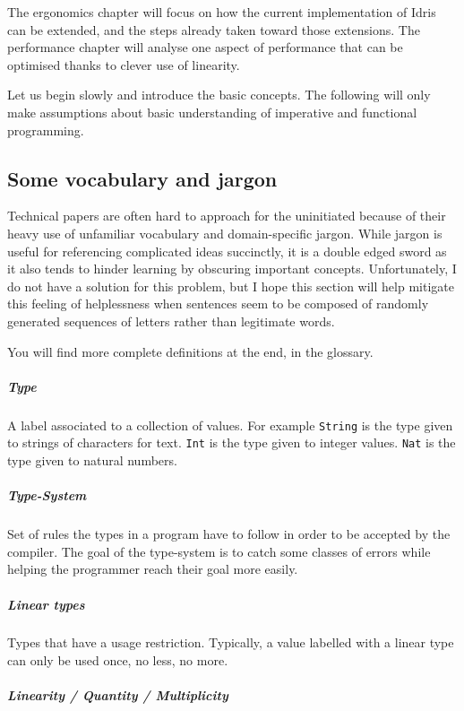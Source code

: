 \documentclass[
]{article}
\begin{document}
The ergonomics chapter will focus on how the current implementation of
Idris can be extended, and the steps already taken toward those
extensions. The performance chapter will analyse one aspect of
performance that can be optimised thanks to clever use of linearity.

Let us begin slowly and introduce the basic concepts. The following will
only make assumptions about basic understanding of imperative and
functional programming.

\hypertarget{some-vocabulary-and-jargon}{%
\subsection{Some vocabulary and
jargon}\label{some-vocabulary-and-jargon}}

Technical papers are often hard to approach for the uninitiated because
of their heavy use of unfamiliar vocabulary and domain-specific jargon.
While jargon is useful for referencing complicated ideas succinctly, it
is a double edged sword as it also tends to hinder learning by obscuring
important concepts. Unfortunately, I do not have a solution for this
problem, but I hope this section will help mitigate this feeling of
helplessness when sentences seem to be composed of randomly generated
sequences of letters rather than legitimate words.

You will find more complete definitions at the end, in the glossary.

\hypertarget{type}{%
\subparagraph{Type}\label{type}}

A label associated to a collection of values. For example
\texttt{String} is the type given to strings of characters for text.
\texttt{Int} is the type given to integer values. \texttt{Nat} is the
type given to natural numbers.

\hypertarget{type-system}{%
\subparagraph{Type-System}\label{type-system}}

Set of rules the types in a program have to follow in order to be
accepted by the compiler. The goal of the type-system is to catch some
classes of errors while helping the programmer reach their goal more
easily.

\hypertarget{linear-types}{%
\subparagraph{Linear types}\label{linear-types}}

Types that have a usage restriction. Typically, a value labelled with a
linear type can only be used once, no less, no more.

\hypertarget{linearity-quantity-multiplicity}{%
\subparagraph{Linearity / Quantity /
Multiplicity}\label{linearity-quantity-multiplicity}}
\end{document}

